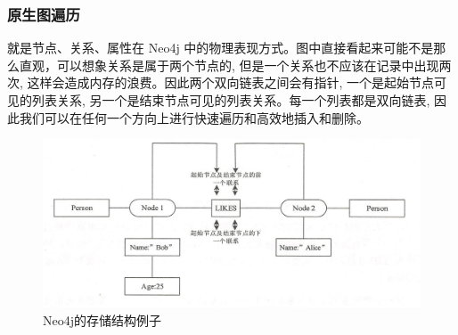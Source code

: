 \subsubsection{原生图遍历}

 就是节点、关系、属性在 Neo4j 中的物理表现方式。图中直接看起来可能不是那么直观，可以想象关系是属于两个节点的, 但是一个关系也不应该在记录中出现两次, 这样会造成内存的浪费。因此两个双向链表之间会有指针, 一个是起始节点可见的列表关系, 另一个是结束节点可见的列表关系。每一个列表都是双向链表, 因此我们可以在任何一个方向上进行快速遍历和高效地插入和删除。
\begin{figure}[H]
	\centering
	\includegraphics[width=1\textwidth]{images/18.png}
	\caption{Neo4j的存储结构例子}
	\label{fig:neo4j-case}
\end{figure}

